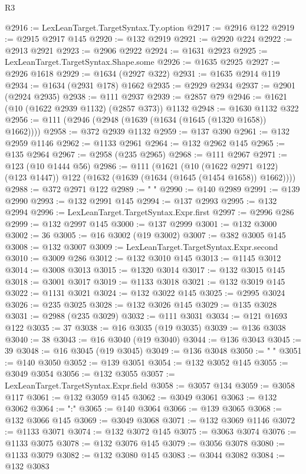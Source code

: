 \begin{lexlean}{R3}
\begin{coremodule}
@2916 := LexLeanTarget.TargetSyntax.Ty.option
@2917 := @2916 @122
@2919 := @2915 @2917 @145
@2920 := @132 @2919
@2921 := @2920 @224
@2922 := @2913 @2921
@2923 := @2906 @2922
@2924 := @1631 @2923
@2925 := LexLeanTarget.TargetSyntax.Shape.some
@2926 := @1635 @2925
@2927 := @2926 @1618
@2929 := @1634 (@2927 @322)
@2931 := @1635 @2914 @119
@2934 := @1634 (@2931 @178) @1662
@2935 := @2929 @2934
@2937 := @2901 (@2924 @2935)
@2938 := @111 @2937
@2939 := @2857 @79
@2946 := @1621 (@10 (@1622 @2939 @1132) (@2857 @373)) @1132
@2948 := @1630 @1132 @322
@2956 := @111 (@2946 (@2948 (@1639 (@1634 (@1645 (@1320 @1658)) @1662))))
@2958 := @372 @2939 @1132
@2959 := @137 @390
@2961 := @132 @2959 @1146
@2962 := @1133 @2961
@2964 := @132 @2962 @145
@2965 := @135 @2964
@2967 := @2958 (@235 @2965)
@2968 := @111 @2967
@2971 := @123 (@10 @1444 @56)
@2986 := @111
    (@1621
      (@10 (@1622 @2971 @122) (@123 @1447))
      @122
      (@1632 (@1639 (@1634 (@1645 (@1454 @1658)) @1662))))
@2988 := @372 @2971 @122
@2989 := "            "
@2990 := @140 @2989
@2991 := @139 @2990
@2993 := @132 @2991 @145
@2994 := @137 @2993
@2995 := @132 @2994
@2996 := LexLeanTarget.TargetSyntax.Expr.first
@2997 := @2996 @286
@2999 := @132 @2997 @145
@3000 := @137 @2999
@3001 := @132 @3000
@3002 := 36
@3005 := @16 @3002 (@19 @3002)
@3007 := @382 @3005 @145
@3008 := @132 @3007
@3009 := LexLeanTarget.TargetSyntax.Expr.second
@3010 := @3009 @286
@3012 := @132 @3010 @145
@3013 := @1145 @3012
@3014 := @3008 @3013
@3015 := @1320 @3014
@3017 := @132 @3015 @145
@3018 := @3001 @3017
@3019 := @1133 @3018
@3021 := @132 @3019 @145
@3022 := @1131 @3021
@3024 := @132 @3022 @145
@3025 := @2995 @3024
@3026 := @235 @3025
@3028 := @132 @3026 @145
@3029 := @135 @3028
@3031 := @2988 (@235 @3029)
@3032 := @111 @3031
@3034 := @121 @1693 @122
@3035 := 37
@3038 := @16 @3035 (@19 @3035)
@3039 := @136 @3038
@3040 := 38
@3043 := @16 @3040 (@19 @3040)
@3044 := @136 @3043
@3045 := 39
@3048 := @16 @3045 (@19 @3045)
@3049 := @136 @3048
@3050 := "  "
@3051 := @140 @3050
@3052 := @139 @3051
@3054 := @132 @3052 @145
@3055 := @3049 @3054
@3056 := @132 @3055
@3057 := LexLeanTarget.TargetSyntax.Expr.field
@3058 := @3057 @134
@3059 := @3058 @117
@3061 := @132 @3059 @145
@3062 := @3049 @3061
@3063 := @132 @3062
@3064 := ":"
@3065 := @140 @3064
@3066 := @139 @3065
@3068 := @132 @3066 @145
@3069 := @3049 @3068
@3071 := @132 @3069 @1146
@3072 := @1133 @3071
@3074 := @132 @3072 @145
@3075 := @3063 @3074
@3076 := @1133 @3075
@3078 := @132 @3076 @145
@3079 := @3056 @3078
@3080 := @1133 @3079
@3082 := @132 @3080 @145
@3083 := @3044 @3082
@3084 := @132 @3083

\end{coremodule}
\end{lexlean}
